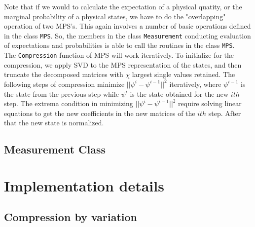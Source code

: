 \documentclass[english]{article}
\begin{document}
Note that if we would to calculate the expectation of a physical quatity, or the marginal probability of a physical states, we have to do the "overlapping" operation of two MPS's. This again involves a number of basic operations defined in the class \texttt{MPS}. So, the members in the class \texttt{Measurement} conducting evaluation of expectations and probabilities is able to call the routines in the class \texttt{MPS}.
\\[3mm]
The \texttt{Compression} function of MPS will work iteratively. To initialize for the compression, we apply SVD to the MPS representation of the states, and then truncate the decomposed matrices with $\chi$ largest single values retained. The following steps of compression minimize $||\psi^i-\psi^{i-1} ||^{2}$ iteratively, where $\psi^{i-1}$ is the state from the previous step while $\psi^i$ is the state obtained for the new $ith$ step. The extrema condition in minimizing $||\psi^i-\psi^{i-1} ||^{2}$ require solving linear equations to get the new coefficients in the new matrices of the $ith$ step. After that the new state is normalized.
\\[3mm]

\subsection{Measurement Class}

\vspace{3mm}

\section{Implementation details}
\subsection{Compression by variation}
\end{document}
